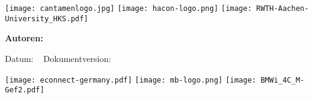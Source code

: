 \begin{titlepage}

\begin{center}
\texttt{[image: cantamenlogo.jpg]}
\texttt{[image: hacon-logo.png]}
\texttt{[image: RWTH-Aachen-University\_HKS.pdf]}
\end{center}

\vspace{1em}

\begin{huge}
\bfseries\center
\thistitle

\end{huge}

\vspace{1em}

\begin{large}
\bfseries\noindent Autoren:\\
\thisauthor

\end{large}

\vspace{1em}

Datum: \thisdate ~ Dokumentversion: \thisversion

\vspace{2em}

\thisabstract
\vspace{2em}
\vfill

\texttt{[image: econnect-germany.pdf]} \hspace{1.5em}
\texttt{[image: mb-logo.png]}
\hfill \texttt{[image: BMWi\_4C\_M-Gef2.pdf]}


\end{titlepage}
